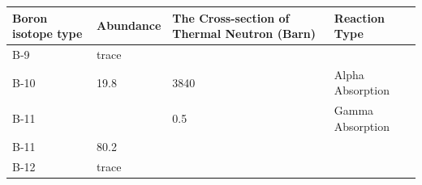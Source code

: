 \documentclass[final,10pt,times,twocolumn]{elsarticle}
\begin{document}
\begin{table}[]
    \centering
    \begin{tabular}{llll}
    \hline
    Boron isotope type & Abundance & The Cross-section of Thermal Neutron (Barn) & Reaction Type    \\ \hline
    B-9                & trace     &                                             &                  \\
    B-10               & 19.8      & 3840                                        & Alpha Absorption \\
    B-11               &           & 0.5                                         & Gamma Absorption \\
    B-11               & 80.2      &                                             &                  \\
    B-12               & trace     &                                             &                  \\ \hline
    \end{tabular}
    \end{table}



\end{document}
